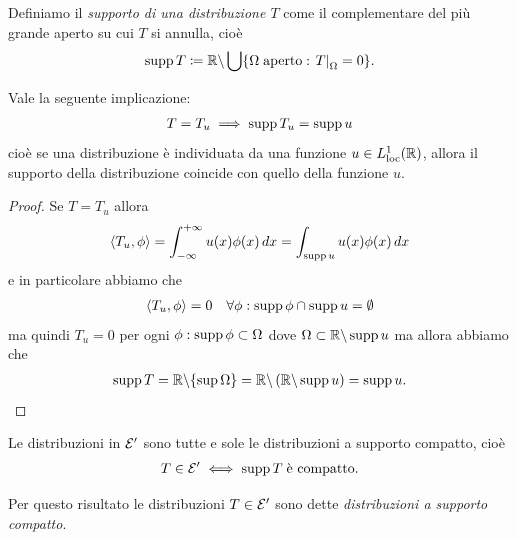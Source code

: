 \begin{definition}
  Definiamo il \textit{supporto di una distribuzione $ T $} come il complementare del più grande aperto su cui $ T $ si annulla, cioè 
  \begin{align}
    \operatorname{\textnormal{supp}} T \coloneq \mathbb{R} \backslash \bigcup\{\Omega \; \textnormal{aperto} : \left.T\right|_\Omega = 0\}.
  \end{align}
\end{definition}

\begin{lemma}[  ] \label{lem: supp T_u {=} supp u}
  Vale la seguente implicazione:
  \begin{align}
    T = T_u \implies \operatorname{\textnormal{supp}} T_u = \operatorname{\textnormal{supp}} u
  \end{align}
  cioè se una distribuzione è individuata da una funzione $ u \in L^1_{\text{loc}}(\mathbb{R}) $, allora il supporto della distribuzione coincide con 
  quello della funzione $ u $.
\end{lemma}
\begin{proof}
  Se $ T = T_u $ allora 
  \begin{align}
    \sc{T_u, \phi} = \int_{-\infty}^{+\infty} u(x) \phi(x) \, dx = \int_{\supp u} u(x) \phi(x) \, dx
  \end{align}
  e in particolare abbiamo che 
  \begin{align}
    \sca{T_u, \phi} = 0 \quad \forall \phi : \supp \phi \cap \supp u = \emptyset
  \end{align}
  ma quindi $ T_u = 0 $ per ogni $ \phi : \supp \phi \subset \Omega $ dove $ \Omega \subset \mathbb{R} \backslash \operatorname{\textnormal{supp}} u $ ma allora abbiamo che 
  \begin{align}
    \operatorname{\textnormal{supp}} T = \mathbb{R} \backslash \{\sup \Omega\} = \mathbb{R} \backslash \left( \mathbb{R} \backslash \operatorname{\textnormal{supp}} u \right) = \operatorname{\textnormal{supp}} u.
  \end{align}
\end{proof}

\begin{lemma}[ Caratterizzazione di $ \E' $ ] \label{lem: caratterizzazione di E'}
  Le distribuzioni in $ \E' $ sono tutte e sole le distribuzioni a supporto compatto, cioè
  \begin{align}
    T \in \mathcal{E}' \iff \operatorname{\textnormal{supp}} T \; \textnormal{è compatto}.
  \end{align}
\end{lemma}

Per questo risultato le distribuzioni $ T \in \mathcal{E}' $ sono dette \textit{distribuzioni a supporto compatto}.

